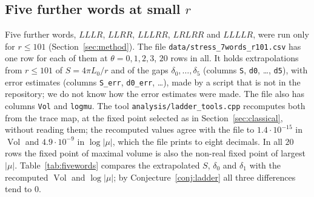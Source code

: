\documentclass[11pt]{amsart}
\theoremstyle{definition}
\theoremstyle{remark}
\newcommand{\Vol}{\operatorname{Vol}}
\begin{document}
\subsection{Five further words at small $r$}\label{sec:fivewords}
Five further words, $LLLR$, $LLRR$, $LLLRR$, $LRLRR$ and $LLLLR$, were run only for
$r \le 101$ (Section~\ref{sec:method}). The file
\texttt{data/stress\_7words\_r101.csv} has one row for each of them at
$\theta = 0, 1, 2, 3$, $20$ rows in all. It
holds extrapolations from $r \le 101$ of $S = 4\pi L_0/r$ and of the gaps
$\delta_0, \dots, \delta_5$ (columns \texttt{S}, \texttt{d0}, \dots, \texttt{d5}), with
error estimates (columns \texttt{S\_err}, \texttt{d0\_err}, \dots), made by a script
that is not in the repository; we do not know how the error estimates were made. The
file also has columns \texttt{Vol} and \texttt{logmu}. The tool
\texttt{analysis/ladder\_tools.cpp} recomputes both from the trace map, at the fixed
point selected as in Section~\ref{sec:classical}, without reading them; the recomputed
values agree with the file to $1.4\cdot10^{-15}$ in $\Vol$ and $4.9\cdot10^{-9}$ in
$\log|\mu|$, which the file prints to eight decimals. In all $20$ rows the fixed point
of maximal volume is also the non-real fixed point of largest $|\mu|$.
Table~\ref{tab:fivewords} compares the extrapolated $S$, $\delta_0$ and $\delta_1$ with
the recomputed $\Vol$ and $\log|\mu|$; by Conjecture~\ref{conj:ladder} all three
differences tend to $0$.
\end{document}
